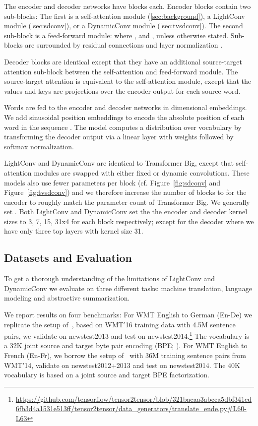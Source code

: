 \documentclass{article} \usepackage{iclr2019_conference,times}
\def\sdconv{LightConv}
\def\tvsdconv{DynamicConv}
\begin{document}
The encoder and decoder networks have  blocks each.
Encoder blocks contain two sub-blocks: The first is a self-attention module (\textsection\ref{sec:background}), a \sdconv{} module (\ref{sec:sdconv}), or a \tvsdconv{} module (\textsection\ref{sec:tvsdconv}).
The second sub-block is a feed-forward module:  where ,  and ,  unless otherwise stated.
Sub-blocks are surrounded by residual connections \citep{he2015deep} and layer normalization \citep{ba2016layer}. 

Decoder blocks are identical except that they have an additional source-target attention sub-block between the self-attention and feed-forward module. 
The source-target attention is equivalent to the self-attention module, except that the values and keys are projections over the encoder output for each source word.

Words are fed to the encoder and decoder networks in  dimensional embeddings. We add sinusoidal position embeddings to encode the absolute position of each word in the sequence \citep{kaiser2017depthwise,vaswani2017transformer}.
The model computes a distribution over vocabulary  by transforming the decoder output via a linear layer with weights  followed by softmax normalization. 

\sdconv{} and \tvsdconv{} are identical to Transformer Big, except that self-attention modules are swapped with either fixed or dynamic convolutions.
These models also use fewer parameters per block (cf. Figure~\ref{fig:sdconv} and Figure~\ref{fig:tvsdconv}) and we 
therefore increase the number of blocks to  for the encoder to roughly match the parameter count of Transformer Big.
We generally set .
Both \sdconv{} and \tvsdconv{} set the the encoder and decoder kernel sizes to 3, 7, 15, 31x4 for each block respectively; except for the decoder where we have only three top layers with kernel size 31.




\subsection{Datasets and Evaluation}\label{sec:datasets}

To get a thorough understanding of the limitations of \sdconv{} and \tvsdconv{} we evaluate on three different tasks: machine translation, language modeling and abstractive summarization.

We report results on four benchmarks: 
For WMT English to German (En-De) we replicate the setup of~\citet{vaswani2017transformer}, based on WMT'16 training data with 4.5M sentence pairs, we validate on newstest2013 and test on newstest2014.\footnote{\scriptsize \url{https://github.com/tensorflow/tensor2tensor/blob/321bacaa3abcca5dbf341ed6fb3d4a1531e513ff/tensor2tensor/data_generators/translate_ende.py\#L60-L63}}
The vocabulary is a 32K joint source and target byte pair encoding (BPE; \citealt{sennrich2016bpe}).
For WMT English to French (En-Fr), we borrow the setup of~\citet{gehring2017convs2s} with 36M training sentence pairs from WMT'14, validate on newstest2012+2013 and test on newstest2014.
The 40K vocabulary is based on a joint source and target BPE factorization.
\end{document}
